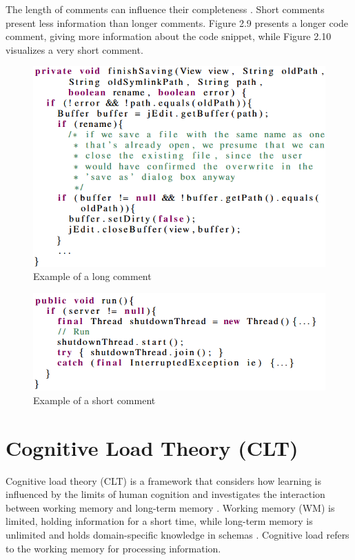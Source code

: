 The length of  comments can influence their completeness \cite{steidl2013quality}. Short comments present less information than longer comments. Figure 2.9 presents a longer code comment, giving more information about the code snippet, while Figure 2.10 visualizes a very short comment.

\begin{figure} [H]
  \centering
  \includegraphics [scale=1]
  {figures/long.png}
  \caption{Example of a long comment
  \cite[p. 6]{steidl2013quality}}
  \label{fig:AnhangsChor}
\end{figure}

\begin{figure} [H]
  \centering
  \includegraphics [scale=0.9]
  {figures/run1.png}
  \caption{Example of a short comment
  \cite[p. 6]{steidl2013quality}}
  \label{fig:AnhangsChor}
\end{figure}





\section{Cognitive Load Theory (CLT)}
Cognitive load theory (CLT) is a framework that considers how learning is influenced by the limits of human cognition and investigates the interaction between working memory and long-term memory \cite{duran2022cognitive}. Working memory (WM) is limited, holding information for a short time, while long-term memory is unlimited and holds domain-specific knowledge in schemas  \cite{zavgorodniaia2020measuring}.
Cognitive load refers to the working memory for processing information. 

